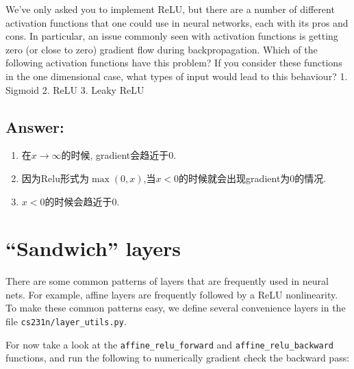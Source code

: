 \documentclass[11pt]{article}
\begin{document}
We've only asked you to implement ReLU, but there are a number of
different activation functions that one could use in neural networks,
each with its pros and cons. In particular, an issue commonly seen with
activation functions is getting zero (or close to zero) gradient flow
during backpropagation. Which of the following activation functions have
this problem? If you consider these functions in the one dimensional
case, what types of input would lead to this behaviour? 1. Sigmoid 2.
ReLU 3. Leaky ReLU

\hypertarget{answer}{%
\subsection{Answer:}\label{answer}}

\begin{enumerate}
\def\labelenumi{\arabic{enumi}.}
\item
  在\({x\to\infty}\)的时候, gradient会趋近于0.
\item
  因为Relu形式为\(\max(0,x)\),当\(x<0\)的时候就会出现gradient为0的情况.
\item
  \(x<0\)的时候会趋近于0.
\end{enumerate}

    \hypertarget{sandwich-layers}{%
\section{``Sandwich'' layers}\label{sandwich-layers}}

There are some common patterns of layers that are frequently used in
neural nets. For example, affine layers are frequently followed by a
ReLU nonlinearity. To make these common patterns easy, we define several
convenience layers in the file \texttt{cs231n/layer\_utils.py}.

For now take a look at the \texttt{affine\_relu\_forward} and
\texttt{affine\_relu\_backward} functions, and run the following to
numerically gradient check the backward pass:
\end{document}

